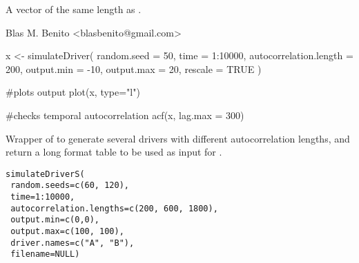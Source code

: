 \documentclass[letterpaper]{book}
\begin{document}
%
\begin{Value}
A vector of the same length as .
\end{Value}
%
\begin{Author}\relax
Blas M. Benito  <blasbenito@gmail.com>
\end{Author}
%
\begin{SeeAlso}\relax
{}
\end{SeeAlso}
%
\begin{Examples}
\begin{ExampleCode}

x <- simulateDriver(
  random.seed = 50,
  time = 1:10000,
  autocorrelation.length = 200,
  output.min = -10,
  output.max = 20,
  rescale = TRUE
  )

#plots output
plot(x, type="l")

#checks temporal autocorrelation
acf(x, lag.max = 300)

\end{ExampleCode}
\end{Examples}
%
\begin{Description}\relax
Wrapper of  to generate several drivers with different autocorrelation lengths, and return a long format table to be used as input for .
\end{Description}
%
\begin{Usage}
\begin{verbatim}
simulateDriverS(
 random.seeds=c(60, 120),
 time=1:10000,
 autocorrelation.lengths=c(200, 600, 1800),
 output.min=c(0,0),
 output.max=c(100, 100),
 driver.names=c("A", "B"),
 filename=NULL)
\end{verbatim}
\end{Usage}
%
\end{document}
